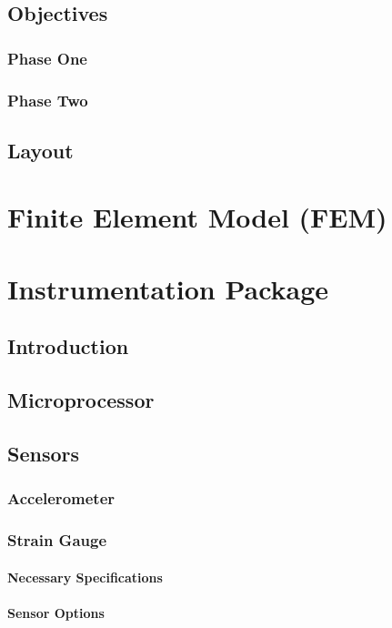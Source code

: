 \documentclass[12pt]{report}
\begin{document}
	\section{Objectives}
		\subsection{Phase One}
		\subsection{Phase Two}
	\section{Layout}
		
		
\chapter{Finite Element Model (FEM)}
\label{ch:FEM}
	

\chapter{Instrumentation Package}
\label{ch:Instrumentation}
	\section{Introduction}
		
	\section{Microprocessor}
		\label{sec:uProcessor}
		
	\section{Sensors}
		\subsection{Accelerometer}
			
		\subsection{Strain Gauge}
			\subsubsection{Necessary Specifications}
			\subsubsection{Sensor Options}
\end{document}
